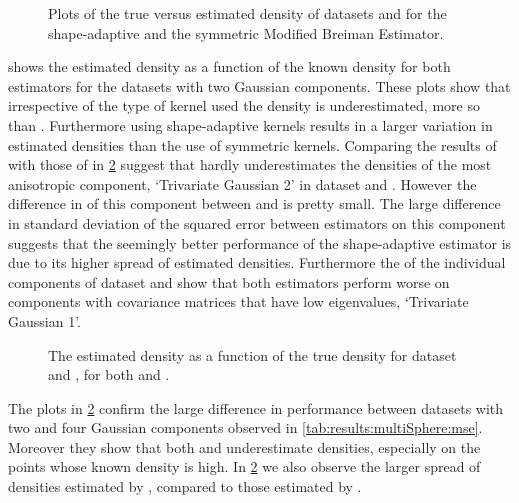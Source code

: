 	\begin{figure}
		\centering
		
		\caption{Plots of the true versus estimated density of datasets \ferdosiTwo and \baakmanTwo for the shape-adaptive and the symmetric Modified Breiman Estimator.}
		\label{fig:results:multiSphere:two:comparativePlots}
	\end{figure}
	 shows the estimated density as a function of the known density for both estimators for the datasets with two Gaussian components. These plots show that irrespective of the type of kernel used the density is underestimated, \mbe more so than \sambe. Furthermore using shape-adaptive kernels results in a larger variation in estimated densities than the use of symmetric kernels. 
		Comparing the results of \sambe with those of \mbe in \cref{fig:results:multiSphere:three:comparativePlots} suggest that \sambe hardly underestimates the densities of the most anisotropic component, \ie `Trivariate Gaussian 2' in dataset \ferdosiTwo and \baakmanTwo. However the difference in \mse of this component between \mbe and \sambe is pretty small. The large difference in standard deviation of the squared error between estimators on this component suggests that the seemingly better performance of the shape-adaptive estimator is due to its higher spread of estimated densities.
		Furthermore the \mses of the individual components of dataset \ferdosiTwo and \baakmanThree show that both estimators perform worse on components with covariance matrices that have low eigenvalues, \eg `Trivariate Gaussian 1'.
	\begin{figure}
		\centering
		
		\caption{The estimated density as a function of the true density for dataset \ferdosiThree and \baakmanThree, for both \mbe and \sambe.}
		\label{fig:results:multiSphere:three:comparativePlots}
	\end{figure}
	The plots in \cref{fig:results:multiSphere:three:comparativePlots} confirm the large difference in performance between datasets with two and four Gaussian components observed in \cref{tab:results:multiSphere:mse}. Moreover they show that both \mbe and \sambe underestimate densities, especially on the points whose known density is high. In \cref{fig:results:multiSphere:three:comparativePlots} we also observe the larger spread of densities estimated by \sambe, compared to those estimated by \mbe.

